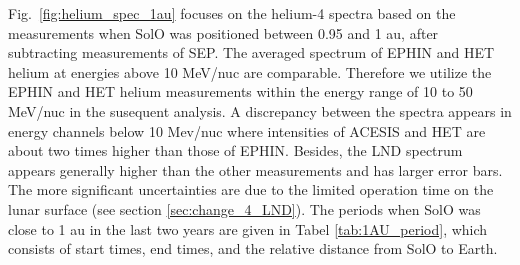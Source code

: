 Fig.~\ref{fig:helium_spec_1au} focuses on the helium-4 spectra based on the measurements when \ac{SolO} was positioned between 0.95 and 1 au, after subtracting measurements of \acs{SEP}. 
The averaged spectrum of \ac{EPHIN} and \ac{HET} helium at energies above 10 MeV/nuc are comparable. Therefore we utilize the \ac{EPHIN} and \ac{HET} helium measurements within the energy range of 10 to 50 MeV/nuc in the susequent analysis.
A discrepancy between the spectra appears in energy channels below 10 Mev/nuc where intensities of \ac{ACESIS} and \ac{HET} are about two times higher than those of \ac{EPHIN}. Besides, the \ac{LND} spectrum appears generally higher than the other measurements and has larger error bars. The more significant uncertainties are due to the limited operation time on the lunar surface (see section \ref{sec:change_4_LND}). The periods when \ac{SolO} was close to 1 au in the last two years are given in Tabel \ref{tab:1AU_period}, which consists of start times, end times, and the relative distance from \ac{SolO} to Earth.



